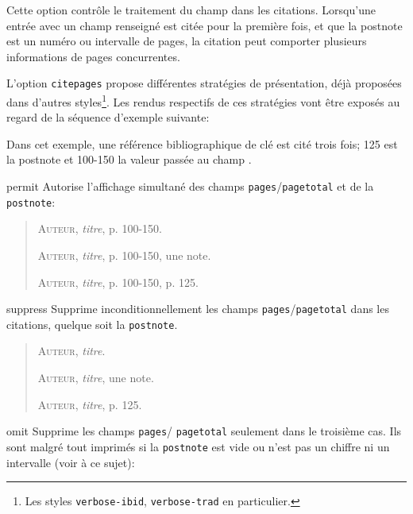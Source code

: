 \documentclass{ltxdockit}
\begin{document}
\begin{optionlist}


Cette option contrôle le traitement du champ  dans les citations. Lorsqu'une entrée avec un champ  renseigné est citée pour la première fois, et que la postnote est un numéro ou intervalle de pages, la citation peut comporter plusieurs informations de pages concurrentes.

L'option \texttt{citepages} propose différentes stratégies de présentation, déjà proposées dans d'autres styles\footnote{Les styles \texttt{verbose-ibid}, \texttt{verbose-trad} en particulier.}. Les rendus respectifs de ces stratégies vont être exposés au regard de la séquence d'exemple suivante:

\begin{ltxexample}
\cite{cle}
\cite[une note]{cle}
\cite[125]{cle}
\end{ltxexample}

Dans cet exemple, une référence bibliographique de clé \bibtex {} est cité trois fois; 125 est la postnote et 100-150 la valeur passée au champ .

\begin{valuelist}
\item[permit] Autorise l'affichage simultané des champs \texttt{pages}\slash \texttt{pagetotal} et de la \texttt{postnote}:

\begin{quote}
\textsc{Auteur}, \emph{titre}, p. 100-150. 

\textsc{Auteur}, \emph{titre}, p. 100-150, une note.

\textsc{Auteur}, \emph{titre}, p. 100-150, p. 125.
\end{quote}
%
\item[suppress] Supprime inconditionnellement les champs \texttt{pages}\slash \texttt{pagetotal} dans les citations, quelque soit la \texttt{postnote}.

\begin{quote}
\textsc{Auteur}, \emph{titre}. 

\textsc{Auteur}, \emph{titre}, une note.

\textsc{Auteur}, \emph{titre}, p. 125.
\end{quote}
%
\item[omit] Supprime les champs \texttt{pages}\slash
\texttt{pagetotal} seulement dans le troisième cas. Ils sont malgré tout imprimés si la \texttt{postnote} est vide ou n'est pas un chiffre ni un intervalle (voir  à ce sujet):


\end{valuelist}
\end{optionlist}
\end{document}
